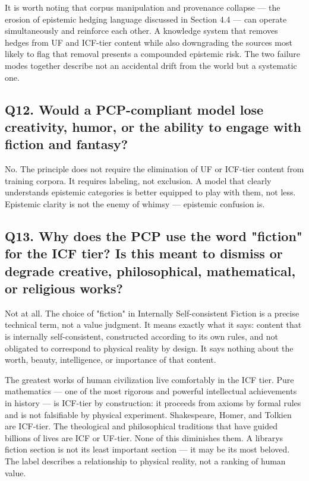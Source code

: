 \documentclass[
]{article}
\begin{document}
It is worth noting that corpus manipulation and provenance collapse ---
the erosion of epistemic hedging language discussed in Section 4.4 ---
can operate simultaneously and reinforce each other. A knowledge system
that removes hedges from UF and ICF-tier content while also downgrading
the sources most likely to flag that removal presents a compounded
epistemic risk. The two failure modes together describe not an
accidental drift from the world but a systematic one.

\subsection{Q12. Would a PCP-compliant model lose creativity, humor, or
the ability to engage with fiction and
fantasy?}\label{q12.-would-a-pcp-compliant-model-lose-creativity-humor-or-the-ability-to-engage-with-fiction-and-fantasy}

No. The principle does not require the elimination of UF or ICF-tier
content from training corpora. It requires labeling, not exclusion. A
model that clearly understands epistemic categories is better equipped
to play with them, not less. Epistemic clarity is not the enemy of
whimsy --- epistemic confusion is.

\subsection{Q13. Why does the PCP use the word "fiction" for the ICF
tier? Is this meant to dismiss or degrade creative, philosophical,
mathematical, or religious
works?}\label{q13.-why-does-the-pcp-use-the-word-fiction-for-the-icf-tier-is-this-meant-to-dismiss-or-degrade-creative-philosophical-mathematical-or-religious-works}

Not at all. The choice of "fiction" in Internally Self-consistent
Fiction is a precise technical term, not a value judgment. It means
exactly what it says: content that is internally self-consistent,
constructed according to its own rules, and not obligated to correspond
to physical reality by design. It says nothing about the worth, beauty,
intelligence, or importance of that content.

The greatest works of human civilization live comfortably in the ICF
tier. Pure mathematics --- one of the most rigorous and powerful
intellectual achievements in history --- is ICF-tier by construction: it
proceeds from axioms by formal rules and is not falsifiable by physical
experiment. Shakespeare, Homer, and Tolkien are ICF-tier. The
theological and philosophical traditions that have guided billions of
lives are ICF or UF-tier. None of this diminishes them. A
library\textquotesingle s fiction section is not its least important
section --- it may be its most beloved. The label describes a
relationship to physical reality, not a ranking of human value.
\end{document}
